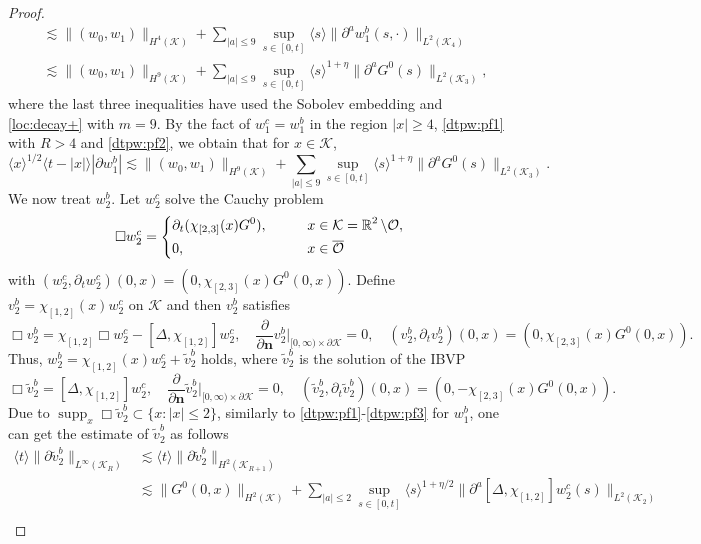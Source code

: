 \documentclass[11pt,twoside]{article}
\def\cK{\mathcal K}
\def\cO{\mathcal O}
\def\R{\mathop{\mathbb R\kern 0pt}\nolimits}
\def\supp{\mathop{\rm supp}\nolimits}
\def\p{\partial}
\def\supp{\operatorname{supp}}
\def\ls{\lesssim}
\def\bn{\mathbf{n}}
\newcommand{\w}[1]{\langle {#1} \rangle}
\theoremstyle{plain}
\theoremstyle{definition}
\numberwithin{equation}{section}
\begin{document}
\begin{proof}
\begin{equation}
\begin{split}
&\ls\|(w_0,w_1)\|_{H^4(\cK)}+\sum_{|a|\le9}\sup_{s\in[0,t]}\w{s}\|\p^aw_1^b(s,\cdot)\|_{L^2(\cK_4)}\\
&\ls\|(w_0,w_1)\|_{H^9(\cK)}+\sum_{|a|\le9}\sup_{s\in[0,t]}\w{s}^{1+\eta}\|\p^aG^0(s)\|_{L^2(\cK_3)},
\end{split}
\end{equation}
where the last three inequalities have used the Sobolev embedding and \eqref{loc:decay+} with $m=9$.
By the fact of $w_1^c=w_1^b$ in the region $|x|\ge4$, \eqref{dtpw:pf1} with $R>4$ and \eqref{dtpw:pf2},
we obtain that for $x\in\cK$,
\begin{equation}\label{dtpw:pf3}
\w{x}^{1/2}\w{t-|x|}|\p w_1^b|
\ls\|(w_0,w_1)\|_{H^9(\cK)}+\sum_{|a|\le9}\sup_{s\in[0,t]}\w{s}^{1+\eta}\|\p^aG^0(s)\|_{L^2(\cK_3)}.
\end{equation}
We now treat $w_2^b$.  Let $w_2^c$ solve the Cauchy problem
\begin{equation}\label{dtpw:pf4}
\Box w_2^c=\left\{
\begin{aligned}
&\p_t(\chi_{[2,3]}(x)G^0),\qquad&& x\in\cK=\R^2\setminus\cO,\\
&0,&& x\in\overline{\cO}
\end{aligned}
\right.
\end{equation}
with $(w_2^c, \p_tw_2^c)(0,x)=(0,\chi_{[2,3]}(x)G^0(0,x))$.
Define $v_2^b=\chi_{[1,2]}(x)w_2^c$ on $\cK$ and then $v_2^b$ satisfies
\begin{equation*}
\Box v_2^b=\chi_{[1,2]}\Box w_2^c-[\Delta,\chi_{[1,2]}]w_2^c,\quad \frac{\p}{\p\bn}v_2^b|_{[0,\infty)\times\p\cK}=0,\quad (v_2^b,\p_tv_2^b)(0,x)=(0,\chi_{[2,3]}(x)G^0(0,x)).
\end{equation*}
Thus, $w_2^b=\chi_{[1,2]}(x)w_2^c+\tilde v_2^b$ holds, where $\tilde v_2^b$ is the solution of the IBVP
\begin{equation*}
\Box\tilde v_2^b=[\Delta,\chi_{[1,2]}]w_2^c,
\quad\frac{\p}{\p\bn}\tilde v_2^b|_{[0,\infty)\times\p\cK}=0,\quad (\tilde v_2^b,\p_t\tilde v_2^b)(0,x)=(0,-\chi_{[2,3]}(x)G^0(0,x)).
\end{equation*}
Due to $\supp_x\Box\tilde v_2^b\subset\{x:|x|\le2\}$, similarly to \eqref{dtpw:pf1}-\eqref{dtpw:pf3} for $w_1^b$,
one can get the estimate of $\tilde v_2^b$ as follows
\begin{equation}\label{dtpw:pf5}
\begin{split}
\w{t}\|\p \tilde v_2^b\|_{L^\infty(\cK_R)}
&\ls\w{t}\|\p \tilde v_2^b\|_{H^2(\cK_{R+1})}\\
&\ls\|G^0(0,x)\|_{H^2(\cK)}+\sum_{|a|\le2}\sup_{s\in[0,t]}\w{s}^{1+\eta/2}\|\p^a[\Delta,\chi_{[1,2]}]w_2^c(s)\|_{L^2(\cK_2)}\\

\end{split}
\end{equation}
\end{proof}
\end{document}
